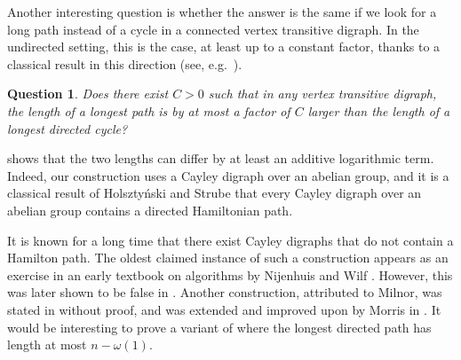 \documentclass[english,11pt]{article}
\newtheorem{qn}[theorem]{Question}
\theoremstyle{definition}
\numberwithin{equation}{section}
\numberwithin{figure}{section}
\begin{document}



Another interesting question is whether the answer is the same if we look for a long path instead of a cycle in a connected vertex transitive digraph. In the undirected setting, this is the case, at least up to a constant factor, thanks to a classical result in this direction (see, e.g.\ \cite{path-vs-cycle}).

\begin{qn}
    Does there exist $C>0$ such that in any vertex transitive digraph, the length of a longest path is by at most a factor of $C$ larger than the length of a longest directed cycle?
\end{qn}

 shows that the two lengths can differ by at least an additive logarithmic term. Indeed, our construction uses a Cayley digraph over an abelian group, and it is a classical result of Holszty\'nski and Strube \cite{abelian-path} that every Cayley digraph over an abelian group contains a directed Hamiltonian path. 

It is known for a long time that there exist Cayley digraphs that do not contain a Hamilton path. The oldest claimed instance of such a construction appears as an exercise in an early textbook on algorithms by Nijenhuis and Wilf \cite{nijenhuis-wilf}. However, this was later shown to be false in \cite{disproof}. Another construction, attributed to Milnor, was stated in \cite{nathanson} without proof, and was extended and improved upon by Morris in \cite{path-non-hamiltonicity}. It would be interesting to prove a variant of  where the longest directed path has length at most $n-\omega(1)$.  
\end{document}
